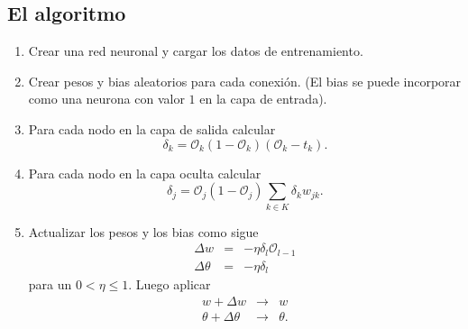 \documentclass[12pt,letterpaper]{article}
\theoremstyle{definition}
\theoremstyle{definition}
\theoremstyle{definition}
\theoremstyle{definition}
\theoremstyle{definition}
\theoremstyle{definition}
\begin{document}
\subsection{El algoritmo}
	\begin{enumerate}
		\item Crear una red neuronal y cargar los datos de entrenamiento.
		\item Crear pesos y bias aleatorios para cada conexión. (El bias se puede incorporar como una neurona con valor $ 1 $ en la capa de entrada).
		\item Para cada nodo en la capa de salida calcular
		\[ \delta_{k}=\mathcal{O}_{k}(1-\mathcal{O}_{k})(\mathcal{O}_{k}-t_{k}). \]
		\item Para cada nodo en la capa oculta calcular
		\[ \delta_{j}=\mathcal{O}_{j}(1-\mathcal{O}_{j})\displaystyle\sum_{k\in K}\delta_{k} w_{j k}. \]
		\item Actualizar los pesos y los bias como sigue
		\begin{eqnarray*}
			\Delta w     &=&-\eta \delta_l \mathcal{O}_{l-1}\\
			\Delta \theta&=&-\eta \delta_l
		\end{eqnarray*}
		para un $ 0<\eta\leq 1 $. Luego aplicar
		\begin{eqnarray*}
			w+\Delta w    	    &\to&w \\
			\theta+\Delta \theta&\to&\theta.
		\end{eqnarray*}
	\end{enumerate}
\end{document}
